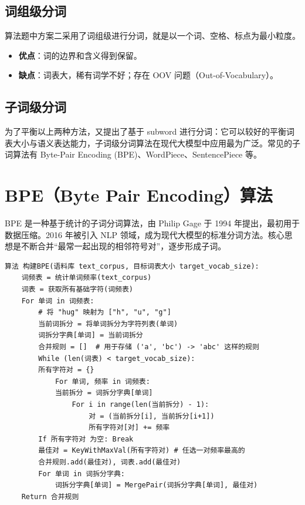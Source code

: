 \documentclass[11pt, a4paper]{article}
\begin{document}
\subsection*{词组级分词}
算法题中方案二采用了词组级进行分词，就是以一个词、空格、标点为最小粒度。
\begin{itemize}
    \item \textbf{优点}：词的边界和含义得到保留。
    \item \textbf{缺点}：词表大，稀有词学不好；存在 OOV 问题（Out-of-Vocabulary）。
\end{itemize}

\subsection*{子词级分词}
为了平衡以上两种方法，又提出了基于 subword 进行分词：它可以较好的平衡词表大小与语义表达能力，子词级分词算法在现代大模型中应用最为广泛。常见的子词算法有 Byte-Pair Encoding (BPE)、WordPiece、SentencePiece 等。

\section{BPE（Byte Pair Encoding）算法}

BPE 是一种基于统计的子词分词算法，由 Philip Gage 于 1994 年提出，最初用于数据压缩。2016 年被引入 NLP 领域，成为现代大模型的标准分词方法。核心思想是不断合并“最常一起出现的相邻符号对”，逐步形成子词。

\begin{lstlisting}[caption={构建 BPE 算法}]
算法 构建BPE(语料库 text_corpus, 目标词表大小 target_vocab_size):
    词频表 = 统计单词频率(text_corpus)
    词表 = 获取所有基础字符(词频表) 
    For 单词 in 词频表:
        # 将 "hug" 映射为 ["h", "u", "g"]
        当前词拆分 = 将单词拆分为字符列表(单词)
        词拆分字典[单词] = 当前词拆分
        合并规则 = []  # 用于存储 ('a', 'bc') -> 'abc' 这样的规则
        While (len(词表) < target_vocab_size):
        所有字符对 = {}
            For 单词, 频率 in 词频表:
            当前拆分 = 词拆分字典[单词]
                For i in range(len(当前拆分) - 1):
                    对 = (当前拆分[i], 当前拆分[i+1])
                    所有字符对[对] += 频率
        If 所有字符对 为空: Break
        最佳对 = KeyWithMaxVal(所有字符对) # 任选一对频率最高的
        合并规则.add(最佳对), 词表.add(最佳对)
        For 单词 in 词拆分字典:
            词拆分字典[单词] = MergePair(词拆分字典[单词], 最佳对)
    Return 合并规则
\end{lstlisting}
\end{document}
